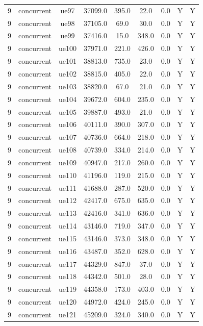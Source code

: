 \begin{table}[ht]
\begin{tabular}{|c|c|c|c|c|c|c|c|c|}
9 & concurrent & ue97 & 37099.0 & 395.0 & 22.0 & 0.0 & Y & Y \\
9 & concurrent & ue98 & 37105.0 & 69.0 & 30.0 & 0.0 & Y & Y \\
9 & concurrent & ue99 & 37416.0 & 15.0 & 348.0 & 0.0 & Y & Y \\
9 & concurrent & ue100 & 37971.0 & 221.0 & 426.0 & 0.0 & Y & Y \\
9 & concurrent & ue101 & 38813.0 & 735.0 & 23.0 & 0.0 & Y & Y \\
9 & concurrent & ue102 & 38815.0 & 405.0 & 22.0 & 0.0 & Y & Y \\
9 & concurrent & ue103 & 38820.0 & 67.0 & 21.0 & 0.0 & Y & Y \\
9 & concurrent & ue104 & 39672.0 & 604.0 & 235.0 & 0.0 & Y & Y \\
9 & concurrent & ue105 & 39887.0 & 493.0 & 21.0 & 0.0 & Y & Y \\
9 & concurrent & ue106 & 40111.0 & 390.0 & 307.0 & 0.0 & Y & Y \\
9 & concurrent & ue107 & 40736.0 & 664.0 & 218.0 & 0.0 & Y & Y \\
9 & concurrent & ue108 & 40739.0 & 334.0 & 214.0 & 0.0 & Y & Y \\
9 & concurrent & ue109 & 40947.0 & 217.0 & 260.0 & 0.0 & Y & Y \\
9 & concurrent & ue110 & 41196.0 & 119.0 & 215.0 & 0.0 & Y & Y \\
9 & concurrent & ue111 & 41688.0 & 287.0 & 520.0 & 0.0 & Y & Y \\
9 & concurrent & ue112 & 42417.0 & 675.0 & 635.0 & 0.0 & Y & Y \\
9 & concurrent & ue113 & 42416.0 & 341.0 & 636.0 & 0.0 & Y & Y \\
9 & concurrent & ue114 & 43146.0 & 719.0 & 347.0 & 0.0 & Y & Y \\
9 & concurrent & ue115 & 43146.0 & 373.0 & 348.0 & 0.0 & Y & Y \\
9 & concurrent & ue116 & 43487.0 & 352.0 & 628.0 & 0.0 & Y & Y \\
9 & concurrent & ue117 & 44329.0 & 847.0 & 37.0 & 0.0 & Y & Y \\
9 & concurrent & ue118 & 44342.0 & 501.0 & 28.0 & 0.0 & Y & Y \\
9 & concurrent & ue119 & 44358.0 & 173.0 & 403.0 & 0.0 & Y & Y \\
9 & concurrent & ue120 & 44972.0 & 424.0 & 245.0 & 0.0 & Y & Y \\
9 & concurrent & ue121 & 45209.0 & 324.0 & 340.0 & 0.0 & Y & Y \\

\end{tabular}
\end{table}
